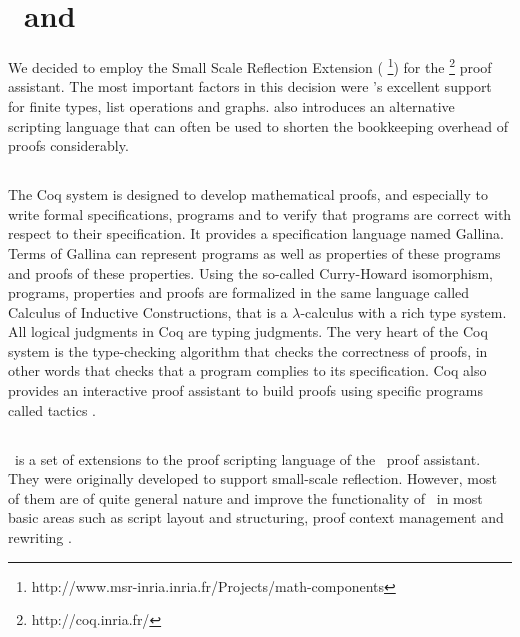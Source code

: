 \chapter{\coq\ and \ssreflect}
\label{chap:coq}


We decided to employ the Small Scale Reflection Extension (\textbf{\ssreflect}%
\footnote{http://www.msr-inria.inria.fr/Projects/math-components})
for the \textbf{\coq}%
\footnote{http://coq.inria.fr/}
proof assistant. 
The most important factors in this decision were \ssreflect's excellent support for finite types, list operations and graphs. \ssreflect{} also introduces an alternative scripting language that can often be used to shorten the bookkeeping overhead of proofs considerably.

\section{\coq}

The Coq system is designed to develop mathematical proofs, and especially to write formal specifications, programs and to verify that programs are correct with respect to their specification. 
It provides a specification language named Gallina. 
Terms of Gallina can represent programs as well as properties of these programs and proofs of these properties. 
Using the so-called Curry-Howard isomorphism, programs, properties and proofs are formalized in the same language called Calculus of Inductive Constructions, that is a $\lambda$-calculus with a rich type system. 
All logical judgments in Coq are typing judgments. 
The very heart of the Coq system is the type-checking algorithm that checks the correctness of proofs, in other words that checks that a program complies to its specification. 
Coq also provides an interactive proof assistant to build proofs using specific programs called tactics \cite{Coq:manual}.



\section{\ssreflect}


\ssreflect\ is a set of extensions to the proof scripting language of the \coq\ proof assistant. 
They were originally developed to support small-scale reflection. 
However, most of them are of quite general nature and improve the functionality of \coq\ in most basic areas such as script layout and structuring, proof context management and rewriting \cite{gonthier:inria-00258384}.



